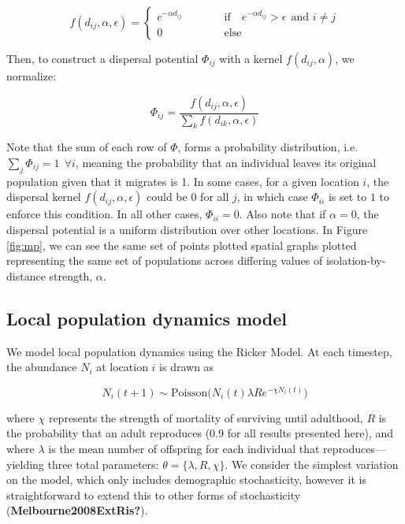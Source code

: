 \documentclass[11pt]{article}
\begin{document}
\[f(d_{ij}, \alpha, \epsilon) =  \begin{cases} e^{-\alpha d_{ij}}
\quad\quad\quad &\text{if}\quad e^{-\alpha d_{ij}} > \epsilon \ \
\text{and } i \neq j \\   0 &\text{else} \end{cases}\]

Then, to construct a dispersal potential \(\Phi_{ij}\) with a kernel
\(f(d_{ij}, \alpha)\), we normalize:

\[\Phi_{ij} = \frac{f(d_{ij}, \alpha, \epsilon)}{\sum_k
f(d_{ik},\alpha, \epsilon)}\]

Note that the sum of each row of \(\Phi\), forms a probability
distribution, i.e.~\(\sum_j \Phi_{ij} = 1 \ \ \forall i\), meaning the
probability that an individual leaves its original population given that
it migrates is 1. In some cases, for a given location \(i\), the
dispersal kernel \(f(d_{ij}, \alpha, \epsilon)\) could be \(0\) for all
\(j\), in which case \(\Phi_{ii}\) is set to \(1\) to enforce this
condition. In all other cases, \(\Phi_{ii}=0\). Also note that if
\(\alpha=0\), the dispersal potential is a uniform distribution over
other locations. In Figure \ref{fig:mp}, we can see the same set of
points plotted spatial graphs plotted representing the same set of
populations across differing values of isolation-by-distance strength,
\(\alpha\).

\hypertarget{local-population-dynamics-model}{%
\subsection{Local population dynamics
model}\label{local-population-dynamics-model}}

We model local population dynamics using the Ricker Model. At each
timestep, the abundance \(N_i\) at location \(i\) is drawn as

\[N_i(t+1) \sim \text{Poisson}\bigg(N_i(t) \lambda R e^{- \chi
N_i(t)}\bigg)\]

where \(\chi\) represents the strength of mortality of surviving until
adulthood, \(R\) is the probability that an adult reproduces (\(0.9\)
for all results presented here), and where \(\lambda\) is the mean
number of offspring for each individual that reproduces---yielding three
total parameters: \(\theta = \{\lambda, R, \chi \}\). We consider the
simplest variation on the model, which only includes demographic
stochasticity, however it is straightforward to extend this to other
forms of stochasticity (\textbf{Melbourne2008ExtRis?}).
\end{document}
